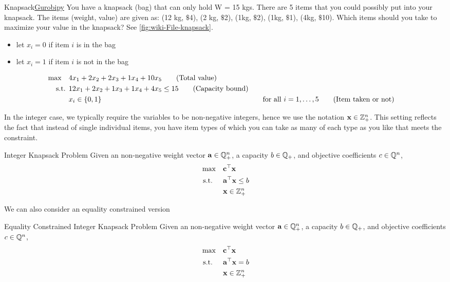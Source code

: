 \begin{examplewithcode}{Knapsack}{\href{https://github.com/open-optimization/open-optimization-or-examples/blob/master/integer-programming/knapsack-problem.ipynb}{Gurobipy}}
\label{example:knapsack}
You have a knapsack (bag) that can only hold W = 15 kgs.  There are 5 items that you could possibly put into your knapsack.  The items (weight, value) are given as:
(12 kg, $\$$4), (2 kg, $\$$2), (1kg, $\$$2), (1kg, $\$$1), (4kg, $\$$10).  Which items should you take to maximize your value in the knapsack? See \autoref{fig:wiki-File-knapsack}.\\

\begin{itemize}
\item let $x_i = 0$ if item $i$ is in the bag
\item let $x_i = 1$ if item $i$ is not in the bag
\end{itemize}
\begin{align}
\max \quad & 4 x_1 + 2 x_2 + 2 x_3 + 1 x_4 + 10 x_5   \tag{Total value} \\
\mbox{ s.t. }        & 12 x_1 + 2 x_2 + 1 x_3 + 1 x_4 + 4 x_5 \leq 15   \tag{Capacity bound} \\
& x_i \in \{0,1\} &&\quad \mbox{for all } i=1, \dots, 5   \tag{Item taken or not}
\end{align}
\end{examplewithcode}
In the integer case, we typically require the variables to be non-negative integers, hence we use the notation $\mathbf{x} \in \mathbb{Z}^n_+$.  This setting reflects the fact that instead of single individual items, you have item types of which you can take as many of each type as you like that meets the constraint.
\begin{general}{Integer Knapsack Problem}{\npcomplete}
Given an non-negative weight vector $\mathbf{a} \in \mathbb{Q}^n_+$, a capacity $b \in \mathbb{Q}_+$, and objective coefficients $c \in \mathbb{Q}^n$, 
\begin{align*}
\max \quad & \mathbf{c}^\top \mathbf{x}\\
\mbox{ s.t. } \quad  & \mathbf{a}^\top \mathbf{x} \leq b\\
& \mathbf{x} \in \mathbb{Z}^n_+
\end{align*}
\end{general}
We can also consider an equality constrained version
\begin{general}{Equality Constrained Integer Knapsack Problem}{\nphard}
Given an non-negative weight vector $\mathbf{a} \in \mathbb{Q}^n_+$, a capacity $b \in \mathbb{Q}_+$, and objective coefficients $c \in \mathbb{Q}^n$, 
\begin{align*}
\max \quad & \mathbf{c}^\top \mathbf{x} \\
\mbox{ s.t. } \quad  & \mathbf{a}^\top \mathbf{x} = b \\
& \mathbf{x} \in \mathbb{Z}^n_+
\end{align*}
\end{general}

